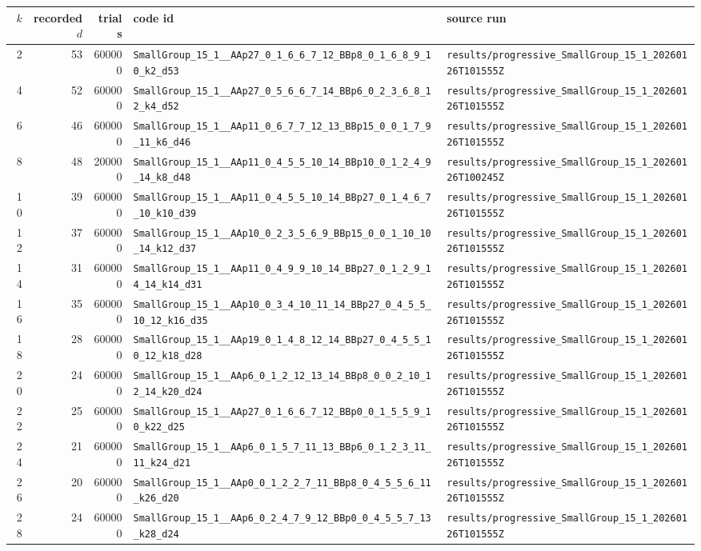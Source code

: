 \documentclass[11pt]{article}
\begin{document}
\begin{longtable}{@{}r r r l l@{}}
\toprule
$k$ & recorded $d$ & trials & code id & source run \\
\midrule
\endhead
2 & 53 & 600000 & \texttt{SmallGroup\_15\_1\_\_AAp27\_0\_1\_6\_6\_7\_12\_BBp8\_0\_1\_6\_8\_9\_10\_k2\_d53} & \texttt{results/progressive\_SmallGroup\_15\_1\_20260126T101555Z} \\
4 & 52 & 600000 & \texttt{SmallGroup\_15\_1\_\_AAp27\_0\_5\_6\_6\_7\_14\_BBp6\_0\_2\_3\_6\_8\_12\_k4\_d52} & \texttt{results/progressive\_SmallGroup\_15\_1\_20260126T101555Z} \\
6 & 46 & 600000 & \texttt{SmallGroup\_15\_1\_\_AAp11\_0\_6\_7\_7\_12\_13\_BBp15\_0\_0\_1\_7\_9\_11\_k6\_d46} & \texttt{results/progressive\_SmallGroup\_15\_1\_20260126T101555Z} \\
8 & 48 & 200000 & \texttt{SmallGroup\_15\_1\_\_AAp11\_0\_4\_5\_5\_10\_14\_BBp10\_0\_1\_2\_4\_9\_14\_k8\_d48} & \texttt{results/progressive\_SmallGroup\_15\_1\_20260126T100245Z} \\
10 & 39 & 600000 & \texttt{SmallGroup\_15\_1\_\_AAp11\_0\_4\_5\_5\_10\_14\_BBp27\_0\_1\_4\_6\_7\_10\_k10\_d39} & \texttt{results/progressive\_SmallGroup\_15\_1\_20260126T101555Z} \\
12 & 37 & 600000 & \texttt{SmallGroup\_15\_1\_\_AAp10\_0\_2\_3\_5\_6\_9\_BBp15\_0\_0\_1\_10\_10\_14\_k12\_d37} & \texttt{results/progressive\_SmallGroup\_15\_1\_20260126T101555Z} \\
14 & 31 & 600000 & \texttt{SmallGroup\_15\_1\_\_AAp11\_0\_4\_9\_9\_10\_14\_BBp27\_0\_1\_2\_9\_14\_14\_k14\_d31} & \texttt{results/progressive\_SmallGroup\_15\_1\_20260126T101555Z} \\
16 & 35 & 600000 & \texttt{SmallGroup\_15\_1\_\_AAp10\_0\_3\_4\_10\_11\_14\_BBp27\_0\_4\_5\_5\_10\_12\_k16\_d35} & \texttt{results/progressive\_SmallGroup\_15\_1\_20260126T101555Z} \\
18 & 28 & 600000 & \texttt{SmallGroup\_15\_1\_\_AAp19\_0\_1\_4\_8\_12\_14\_BBp27\_0\_4\_5\_5\_10\_12\_k18\_d28} & \texttt{results/progressive\_SmallGroup\_15\_1\_20260126T101555Z} \\
20 & 24 & 600000 & \texttt{SmallGroup\_15\_1\_\_AAp6\_0\_1\_2\_12\_13\_14\_BBp8\_0\_0\_2\_10\_12\_14\_k20\_d24} & \texttt{results/progressive\_SmallGroup\_15\_1\_20260126T101555Z} \\
22 & 25 & 600000 & \texttt{SmallGroup\_15\_1\_\_AAp27\_0\_1\_6\_6\_7\_12\_BBp0\_0\_1\_5\_5\_9\_10\_k22\_d25} & \texttt{results/progressive\_SmallGroup\_15\_1\_20260126T101555Z} \\
24 & 21 & 600000 & \texttt{SmallGroup\_15\_1\_\_AAp6\_0\_1\_5\_7\_11\_13\_BBp6\_0\_1\_2\_3\_11\_11\_k24\_d21} & \texttt{results/progressive\_SmallGroup\_15\_1\_20260126T101555Z} \\
26 & 20 & 600000 & \texttt{SmallGroup\_15\_1\_\_AAp0\_0\_1\_2\_2\_7\_11\_BBp8\_0\_4\_5\_5\_6\_11\_k26\_d20} & \texttt{results/progressive\_SmallGroup\_15\_1\_20260126T101555Z} \\
28 & 24 & 600000 & \texttt{SmallGroup\_15\_1\_\_AAp6\_0\_2\_4\_7\_9\_12\_BBp0\_0\_4\_5\_5\_7\_13\_k28\_d24} & \texttt{results/progressive\_SmallGroup\_15\_1\_20260126T101555Z} \\
\bottomrule
\end{longtable}
\end{document}
